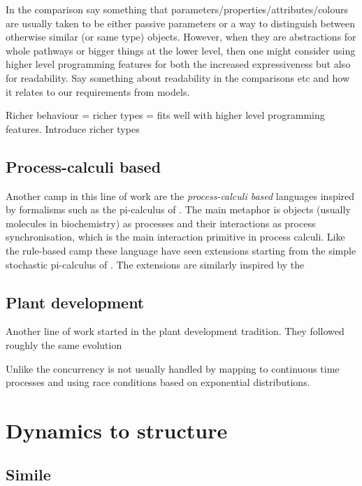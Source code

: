 \documentclass[phd]{infthesis}
\begin{document}
In the comparison say something that parameters/properties/attributes/colours
are usually taken to be either passive parameters or a way to distinguish
between otherwise similar (or same type) objects.  However, when they are
abstractions for whole pathways or bigger things at the lower level, then one
might consider using higher level programming features for both the increased
expressiveness but also for readability.  Say something about readability in the
comparisons etc and how it relates to our requirements from models.

Richer behaviour = richer types = fits well with higher level programming features.
Introduce richer types



\subsection{Process-calculi based}
Another camp in this line of work are the \emph{process-calculi based} languages
inspired by formalisms such as the pi-calculus of
\cite{milner1999communicating}. The main metaphor is objects (usually molecules
in biochemistry) as processes and their interactions as process synchronisation,
which is the main interaction primitive in process calculi. Like the rule-based
camp these language have seen extensions starting from the simple stochastic
pi-calculus of \citet{}. The extensions are similarly inspired by the 

\subsection{Plant development}
Another line of work started in the plant development tradition.
They followed roughly the same evolution

Unlike the concurrency is not usually handled by mapping to continuous time
processes and using race conditions based on exponential distributions.


\section{Dynamics to structure}
\subsection{Simile}



\singlespace



\printbibliography[heading=bibintoc]

\end{document}
